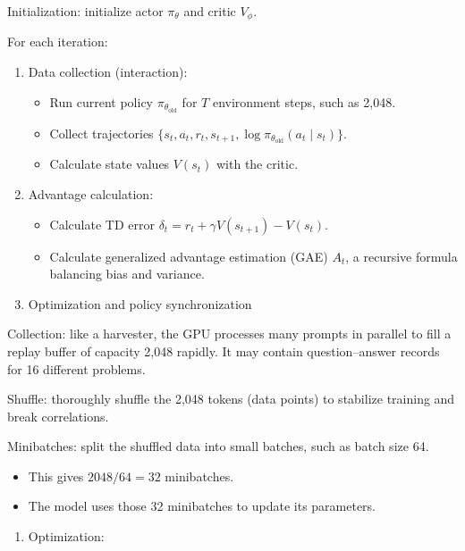 Initialization: initialize actor \(\pi_\theta\) and critic \(V_\phi\).

For each iteration:

\begin{enumerate}
\def\labelenumi{\arabic{enumi}.}
\tightlist
\item
{}
  Data collection (interaction):

  \begin{itemize}
  \tightlist
  \item
    Run current policy \(\pi_{\theta_{\mathrm{old}}}\) for \(T\) environment steps, such as 2,048.
  \item
    Collect trajectories \(\{s_t, a_t, r_t, s_{t+1}, \log \pi_{\theta_{\mathrm{old}}}(a_t \mid s_t)\}\).
  \item
    Calculate state values \(V(s_t)\) with the critic.
  \end{itemize}
\item
{}
  Advantage calculation:

  \begin{itemize}
  \tightlist
  \item
    Calculate TD error \(\delta_t = r_t + \gamma V(s_{t+1}) - V(s_t)\).
  \item
    Calculate generalized advantage estimation (GAE) \(A_t\), a recursive formula balancing bias and variance.
  \end{itemize}
\item
  Optimization and policy synchronization
\end{enumerate}

Collection: like a harvester, the GPU processes many prompts in parallel to fill a replay buffer of capacity 2,048 rapidly. It may contain question--answer records for 16 different problems.

Shuffle: thoroughly shuffle the 2,048 tokens (data points) to stabilize training and break correlations.

Minibatches: split the shuffled data into small batches, such as batch size 64.

\begin{itemize}
\tightlist
\item
  This gives \(2048 / 64 = 32\) minibatches.
\item
  The model uses those 32 minibatches to update its parameters.
\end{itemize}

\begin{enumerate}
\def\labelenumi{\arabic{enumi}.}
\setcounter{enumi}{2}
\tightlist
\item
{}
  Optimization:
\end{enumerate}

